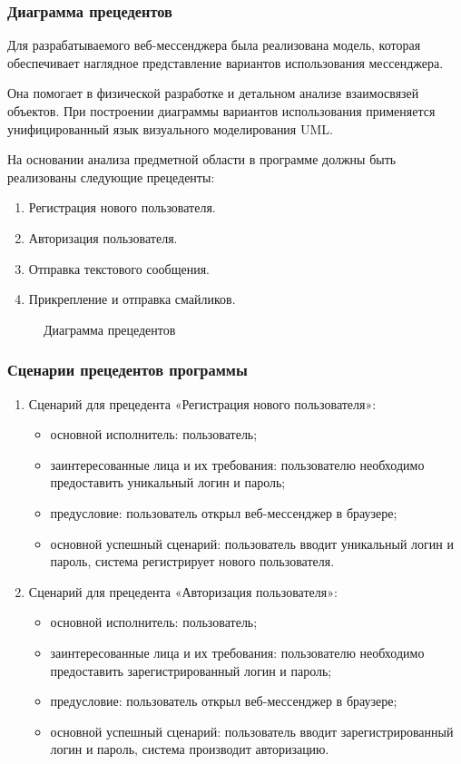 \begin{enumerate}
 \subsubsection{Диаграмма прецедентов}
Для разрабатываемого веб-мессенджера была реализована модель, которая обеспечивает наглядное представление вариантов использования мессенджера.

Она помогает в физической разработке и детальном анализе взаимосвязей объектов. При построении диаграммы вариантов использования применяется унифицированный язык визуального моделирования UML.

На основании анализа предметной области в программе должны быть реализованы следующие прецеденты:
\begin{enumerate}
	\item Регистрация нового пользователя.
	\item Авторизация пользователя.
	\item Отправка текстового сообщения.
	\item Прикрепление и отправка смайликов.
\end{enumerate}

\begin{figure}[ht]
	\caption{Диаграмма прецедентов}
	\label{precend:image}
\end{figure}

 \subsubsection{Сценарии прецедентов программы}
 
 \begin{enumerate}
 	\item Сценарий для прецедента «Регистрация нового пользователя»:
 	\begin{itemize}
 		\item основной исполнитель: пользователь;
 		\item заинтересованные лица и их требования: пользователю необходимо предоставить уникальный логин и пароль;
 		\item предусловие: пользователь открыл веб-мессенджер в браузере;
 		\item основной успешный сценарий: пользователь вводит уникальный логин и пароль, система регистрирует нового пользователя.
 	\end{itemize}
	\item Сценарий для прецедента «Авторизация пользователя»:
	\begin{itemize}
		\item основной исполнитель: пользователь;
		\item заинтересованные лица и их требования: пользователю необходимо предоставить зарегистрированный логин и пароль;
		\item предусловие: пользователь открыл веб-мессенджер в браузере;
		\item основной успешный сценарий: пользователь вводит зарегистрированный логин и пароль, система производит авторизацию.
	\end{itemize}
	

\end{enumerate}
\end{enumerate}
